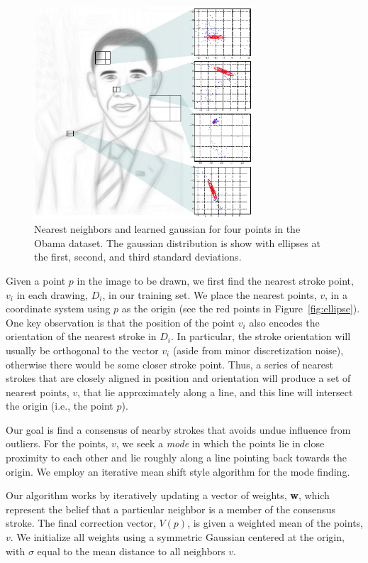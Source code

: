 \begin{figure}
  \centering%
  \includegraphics[width=3.2in]{figures/nearest-neighbor-plots.pdf}
  \caption{Nearest neighbors and learned gaussian for four points in the Obama dataset.  The gaussian distribution is show with ellipses at the first, second, and third standard deviations.  }
  \label{fig:neighbors}
\end{figure}


Given a point $p$ in the image to be drawn, we first find the nearest stroke point, $v_i$ in each drawing, $D_i$, in our training set. We place the nearest points, $v$, in a coordinate system using $p$ as the origin (see the red points in Figure~\ref{fig:ellipse}). One key observation is that the position of the point $v_i$ also encodes the orientation of the nearest stroke in $D_i$. In particular, the stroke orientation will usually be orthogonal to the vector $v_i$ (aside from minor discretization noise), otherwise there would be some closer stroke point. Thus, a series of nearest strokes that are closely aligned in position and orientation will produce a set of nearest points, $v$, that lie approximately along a line, and this line will intersect the origin (i.e., the point $p$).

Our goal is find a consensus of nearby strokes that avoids undue influence from outliers. For the points, $v$, we seek a {\em mode} in which the points lie in close proximity to each other and lie roughly along a line pointing back towards the origin. We employ an iterative mean shift style algorithm for the mode finding.

Our algorithm works by iteratively updating a vector of weights, {\bf w}, which represent the belief that a particular neighbor is a member of the consensus stroke. The final correction vector, $V(p)$, is given a weighted mean of the points, $v$. We initialize all weights using a symmetric Gaussian centered at the origin, with $\sigma$ equal to the mean distance to all neighbors $v$.


